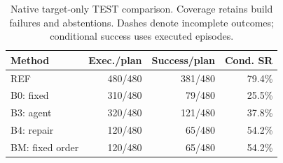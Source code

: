 \begin{table}[t]
\centering\small
\caption{Native target-only TEST comparison. Coverage retains build failures and abstentions. Dashes denote incomplete outcomes; conditional success uses executed episodes.}
\label{tab:native-test}
\begin{tabular}{lrrr}
\toprule
Method & Exec./plan & Success/plan & Cond. SR \\
\midrule
REF & 480/480 & 381/480 & 79.4\% \\
B0: fixed & 310/480 & 79/480 & 25.5\% \\
B3: agent & 320/480 & 121/480 & 37.8\% \\
B4: repair & 120/480 & 65/480 & 54.2\% \\
BM: fixed order & 120/480 & 65/480 & 54.2\% \\
\bottomrule
\end{tabular}
\end{table}
